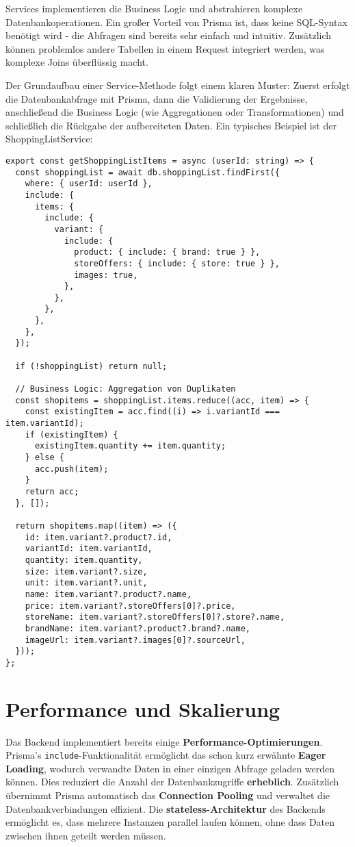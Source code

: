 Services implementieren die Business Logic und abstrahieren komplexe Datenbankoperationen. Ein großer Vorteil von Prisma ist, dass keine SQL-Syntax benötigt wird - die Abfragen sind bereits sehr einfach und intuitiv. Zusätzlich können problemlos andere Tabellen in einem Request integriert werden, was komplexe Joins überflüssig macht.

Der Grundaufbau einer Service-Methode folgt einem klaren Muster: Zuerst erfolgt die Datenbankabfrage mit Prisma, dann die Validierung der Ergebnisse, anschließend die Business Logic (wie Aggregationen oder Transformationen) und schließlich die Rückgabe der aufbereiteten Daten. Ein typisches Beispiel ist der ShoppingListService:

\begin{lstlisting}[style=typescriptstyle,caption={Service-Layer Beispiel}]
export const getShoppingListItems = async (userId: string) => {
  const shoppingList = await db.shoppingList.findFirst({
    where: { userId: userId },
    include: {
      items: {
        include: {
          variant: {
            include: {
              product: { include: { brand: true } },
              storeOffers: { include: { store: true } },
              images: true,
            },
          },
        },
      },
    },
  });

  if (!shoppingList) return null;

  // Business Logic: Aggregation von Duplikaten
  const shopitems = shoppingList.items.reduce((acc, item) => {
    const existingItem = acc.find((i) => i.variantId === item.variantId);
    if (existingItem) {
      existingItem.quantity += item.quantity;
    } else {
      acc.push(item);
    }
    return acc;
  }, []);

  return shopitems.map((item) => ({
    id: item.variant?.product?.id,
    variantId: item.variantId,
    quantity: item.quantity,
    size: item.variant?.size,
    unit: item.variant?.unit,
    name: item.variant?.product?.name,
    price: item.variant?.storeOffers[0]?.price,
    storeName: item.variant?.storeOffers[0]?.store?.name,
    brandName: item.variant?.product?.brand?.name,
    imageUrl: item.variant?.images[0]?.sourceUrl,
  }));
};
\end{lstlisting}

\section{Performance und Skalierung}

Das Backend implementiert bereits einige \textbf{Performance-Optimierungen}. Prisma's \texttt{include}-Funktionalität ermöglicht das schon kurz erwähnte \textbf{Eager Loading}, wodurch verwandte Daten in einer einzigen Abfrage geladen werden können. Dies reduziert die Anzahl der Datenbankzugriffe \textbf{erheblich}. Zusätzlich übernimmt Prisma automatisch das \textbf{Connection Pooling} und verwaltet die Datenbankverbindungen effizient. Die \textbf{stateless-Architektur} des Backends ermöglicht es, dass mehrere Instanzen parallel laufen können, ohne dass Daten zwischen ihnen geteilt werden müssen.

